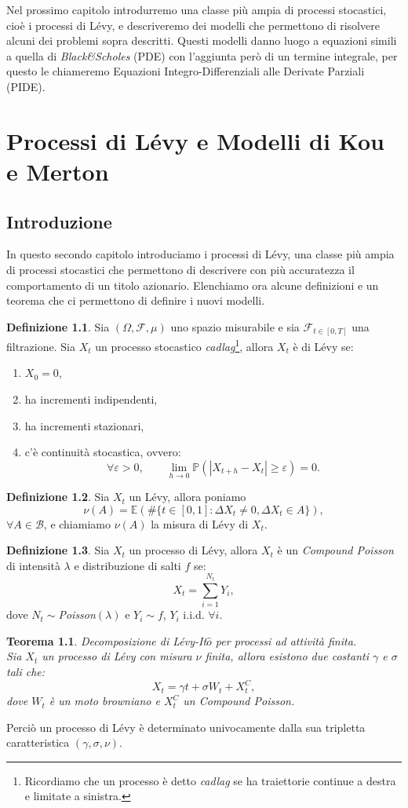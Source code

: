 \documentclass[a4paper,10pt]{report}
\theoremstyle{plain}
\newtheorem{theorem}{Teorema}[chapter]
\theoremstyle{definition}
\newtheorem{definition}{Definizione}[chapter]
\theoremstyle{remark}
\begin{document}
Nel prossimo capitolo introdurremo una classe pi\`u ampia di processi stocastici, cio\`e i processi di L\'evy, e descriveremo dei modelli che permettono di risolvere alcuni dei problemi sopra descritti. Questi modelli danno luogo a equazioni simili a quella di \emph{Black\&Scholes} (PDE) con l'aggiunta per\`o di un termine integrale, per questo le chiameremo Equazioni Integro-Differenziali alle Derivate Parziali (PIDE).

\chapter{Processi di L\'evy e Modelli di Kou e Merton}
\section{Introduzione}
In questo secondo capitolo introduciamo i processi di L\'evy, una classe pi\`u ampia di processi stocastici che permettono di descrivere con pi\`u accuratezza il comportamento di un titolo azionario. Elenchiamo ora alcune definizioni e un teorema che ci permettono di definire i nuovi modelli.
\begin{definition}
Sia $(\Omega, \mathcal{F}, \mu)$ uno spazio misurabile e sia $\mathcal{F}_{t\in[0,T]}$ una filtrazione. Sia $X_t$ un processo stocastico \emph{cadlag}\footnote{Ricordiamo che un processo \`e detto \emph{cadlag} se ha traiettorie continue a destra e limitate a sinistra.}, allora $X_t$ \`e di L\'evy se:
\begin{enumerate}
\item $X_0=0$,
\item ha incrementi indipendenti,
\item ha incrementi stazionari,
\item c'\`e continuit\`a stocastica, ovvero: $$\forall \varepsilon >0,\qquad\lim_{h\to0}\mathbb{P}(|X_{t+h}-X_t|\geq\varepsilon)=0.$$
\end{enumerate}
\end{definition}
\begin{definition}
Sia $X_t$ un L\'evy, allora poniamo $$\nu(A)=\mathbb{E}(\#\{t\in[0,1]: \Delta X_t\neq0, \Delta X_t\in A\}),$$ $\forall A\in \mathcal{B}$, e chiamiamo $\nu(A)$ la misura di L\'evy di $X_t$.
\end{definition}
\begin{definition}
Sia $X_t$ un processo di L\'evy, allora $X_t$ \`e un \emph{Compound Poisson} di intensit\`a $\lambda$ e distribuzione di salti $f$ se: $$X_t=\sum_{i=1}^{N_t}Y_i,$$ dove $N_t\sim$\emph{Poisson}$(\lambda)$ e $Y_i\sim f$, $Y_i$ i.i.d. $\forall i$.
\end{definition}
\begin{theorem}
Decomposizione di L\'evy-It$\hat{o}$ per processi ad attività finita.\\Sia $X_t$ un processo di L\'evy con misura $\nu$ finita, allora esistono due costanti $\gamma$ e $\sigma$ tali che:$$X_t=\gamma t+\sigma W_t+X^C_t,$$ dove $W_t$ \`e un moto browniano e $X^C_t$ un \emph{Compound Poisson}.
\end{theorem}
Perci\`o un processo di L\'evy \`e determinato univocamente dalla sua tripletta caratteristica $(\gamma, \sigma, \nu)$.
\end{document}
